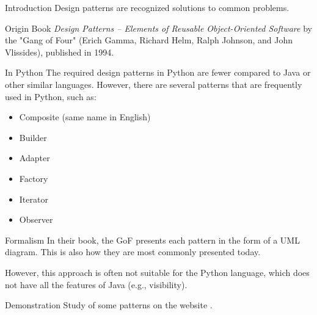 \begin{frame}{Introduction}
  Design patterns are recognized solutions to common problems.
\end{frame}

\begin{frame}{Origin}
  Book \textit{Design Patterns – Elements of Reusable Object-Oriented Software} by the "Gang of Four" (Erich Gamma, Richard Helm, Ralph Johnson, and John Vlissides), published in 1994.
\end{frame}

\begin{frame}{In Python}
  The required design patterns in Python are fewer compared to Java or other similar languages. However, there are several patterns that are frequently used in Python, such as:

  \begin{itemize}
    \item Composite (same name in English)
    \item Builder
    \item Adapter
    \item Factory
    \item Iterator
    \item Observer
  \end{itemize}
\end{frame}

\begin{frame}{Formalism}
  In their book, the GoF presents each pattern in the form of a UML diagram. This is also how they are most commonly presented today.

  However, this approach is often not suitable for the Python language, which
  does not have all the features of Java (e.g., visibility).
\end{frame}

\begin{frame}{Demonstration}
  Study of some patterns on the website .
\end{frame}
